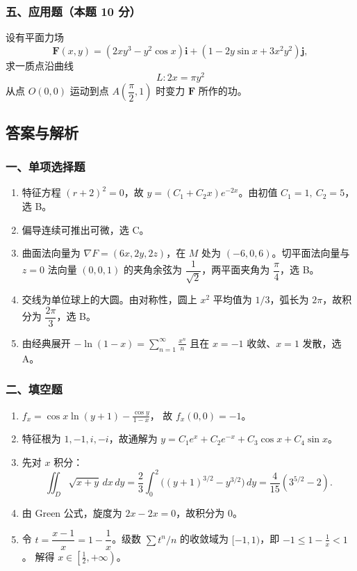 \subsubsection*{五、应用题（本题 10 分）}
设有平面力场
\[
\mathbf F(x,y)=(2xy^3-y^2\cos x)\mathbf i+(1-2y\sin x+3x^2y^2)\mathbf j,
\]
求一质点沿曲线
\[
L:2x=\pi y^2
\]
从点 $O(0,0)$ 运动到点 $A\!\left(\dfrac\pi2,1\right)$ 时变力 $\mathbf F$ 所作的功。

\subsection{答案与解析}

\subsubsection*{一、单项选择题}
\begin{enumerate}
  \item 特征方程 $(r+2)^2=0$，故 $y=(C_1+C_2x)e^{-2x}$。由初值 $C_1=1,\ C_2=5$，选 B。
  \item 偏导连续可推出可微，选 C。
  \item 曲面法向量为 $\nabla F=(6x,2y,2z)$，在 $M$ 处为 $(-6,0,6)$。切平面法向量与 $z=0$ 法向量 $(0,0,1)$ 的夹角余弦为 $\dfrac1{\sqrt2}$，两平面夹角为 $\dfrac\pi4$，选 B。
  \item 交线为单位球上的大圆。由对称性，圆上 $x^2$ 平均值为 $1/3$，弧长为 $2\pi$，故积分为 $\dfrac{2\pi}{3}$，选 B。
  \item 由经典展开
  \(\displaystyle -\ln(1-x)=\sum_{n=1}^{\infty}\frac{x^n}{n}\)
  且在 $x=-1$ 收敛、$x=1$ 发散，选 A。
\end{enumerate}

\subsubsection*{二、填空题}
\begin{enumerate}
  \item \(\displaystyle f_x=\cos x\ln(y+1)-\frac{\cos y}{1-x}\)，
  故 $f_x(0,0)=-1$。
  \item 特征根为 $1,-1,i,-i$，故通解为
  \(\displaystyle y=C_1e^x+C_2e^{-x}+C_3\cos x+C_4\sin x\)。
  \item 先对 $x$ 积分：
  \[
  \iint_D\sqrt{x+y}\,dx\,dy
  =\frac23\int_0^2\bigl((y+1)^{3/2}-y^{3/2}\bigr)\,dy
  =\frac4{15}(3^{5/2}-2).
  \]
  \item 由 Green 公式，旋度为 $2x-2x=0$，故积分为 $0$。
  \item 令 $t=\dfrac{x-1}{x}=1-\dfrac1x$。级数 $\sum t^n/n$ 的收敛域为 $[-1,1)$，即
  \(\displaystyle -1\le1-\frac1x<1\)。
  解得
  \(\displaystyle x\in\left[\frac12,+\infty\right)\)。
\end{enumerate}

